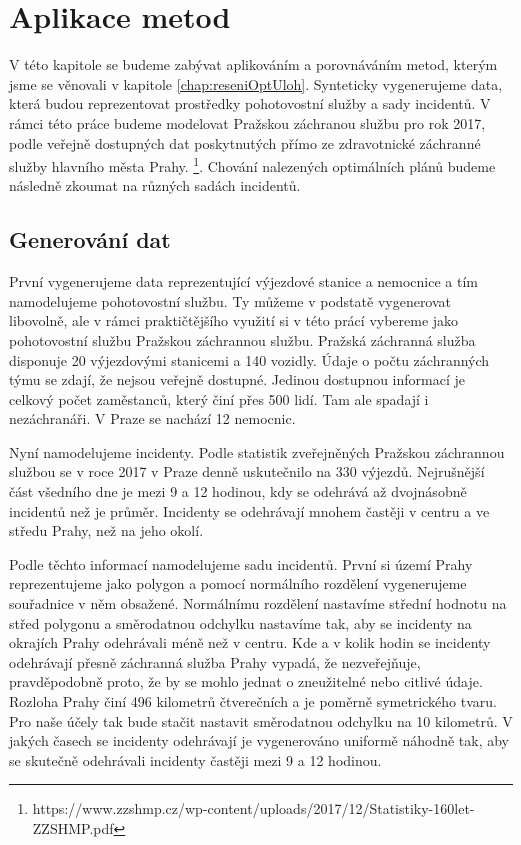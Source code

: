 \chapter{Aplikace metod}

V této kapitole se budeme zabývat aplikováním a porovnáváním metod, kterým jsme se věnovali v kapitole \ref{chap:reseniOptUloh}.
Synteticky vygenerujeme data, která budou reprezentovat prostředky pohotovostní služby a sady incidentů. 
V rámci této práce budeme modelovat Pražskou záchranou službu pro rok 2017, podle veřejně dostupných dat
poskytnutých přímo ze zdravotnické záchranné služby hlavního města Prahy.
\footnote{https://www.zzshmp.cz/wp-content/uploads/2017/12/Statistiky-160let-ZZSHMP.pdf}.
Chování nalezených optimálních plánů budeme následně zkoumat na různých sadách incidentů.

\section{Generování dat}

První vygenerujeme data reprezentující výjezdové stanice a nemocnice a tím namodelujeme pohotovostní službu.
Ty můžeme v podstatě vygenerovat libovolně, ale v rámci praktičtějšího využití
si v této prácí vybereme jako pohotovostní službu Pražskou záchrannou službu.
Pražská záchranná služba disponuje 20 výjezdovými stanicemi a 140 vozidly.
Údaje o počtu záchranných týmu se zdají, že nejsou veřejně dostupné. Jedinou dostupnou informací je celkový počet zaměstanců, který činí přes 500 lidí.
Tam ale spadají i nezáchranáři.
V Praze se nachází 12 nemocnic.

Nyní namodelujeme incidenty. Podle statistik zveřejněných Pražskou záchrannou službou se v roce 2017 v Praze denně uskutečnilo na 330 výjezdů.
Nejrušnější část všedního dne je mezi 9 a 12 hodinou, kdy se odehrává až dvojnásobně incidentů než je průměr.
Incidenty se odehrávají mnohem častěji v centru a ve středu Prahy, než na jeho okolí. 

Podle těchto informací namodelujeme sadu incidentů.
První si území Prahy reprezentujeme jako polygon a pomocí normálního rozdělení vygenerujeme souřadnice v něm obsažené.
Normálnímu rozdělení nastavíme střední hodnotu na střed polygonu a směrodatnou odchylku nastavíme tak, aby se incidenty na okrajích Prahy odehrávali méně než v centru. 
Kde a v kolik hodin se incidenty odehrávají přesně záchranná služba Prahy vypadá, že nezveřejňuje, pravděpodobně proto, že by se mohlo jednat o zneužitelné nebo citlivé údaje.
Rozloha Prahy činí 496 kilometrů čtverečních a je poměrně symetrického tvaru. Pro naše účely tak bude stačit nastavit směrodatnou odchylku na 10 kilometrů.
V jakých časech se incidenty odehrávají je vygenerováno uniformě náhodně tak, aby se skutečně odehrávali incidenty častěji mezi 9 a 12 hodinou.

